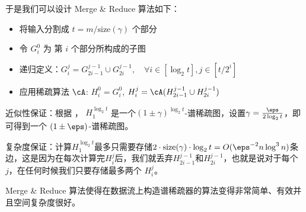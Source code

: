 \documentclass[lang=cn,newtx,10pt,scheme=chinese,chinesefont=nofont,citestyle=gb7714-2015, bibstyle=gb7714-2015]{elegantbook}
\begin{document}
\begin{refsection}
\begin{proposition}
\end{proposition}

于是我们可以设计 Merge \& Reduce 算法如下：
\begin{itemize}
    \item 将输入分割成 $t=m/\text{size}(\gamma)$ 个部分
    \item 令 $G_i^0$ 为 第 $i$ 个部分所构成的子图
    \item 递归定义：$G_i^j=G_{2i-1}^{j-1}\cup G_{2i}^{j-1},\quad \forall i\in[\log_2t],j\in [t/2^i]$
    \item 应用稀疏算法 $\cA$: $H_i^0=G_i^0$, $H_i^j=\cA(H_{2i-1}^{j-1}\cup H_{2i}^{j-1})$
\end{itemize}

近似性保证：根据 ， $H_1^{\log_2t}$ 是一个$(1\pm\gamma)^{\log_2t}$-谱稀疏图，设置$\gamma=\frac{\eps}{2\log_2t}$，即可得到一个 $(1\pm\eps)$-谱稀疏图。

复杂度保证：计算$H_1^{\log_2t}$最多只需要存储$2\cdot \text{size}(\gamma)\cdot \log_2t=O(\eps^{-2}n\log^3n)$条边，这是因为在每次计算完$H_i^j$后，我们就丢弃$H_{2i-1}^{j-1} $和$ H_{2i}^{j-1}$，也就是说对于每个 $j$，在任何时候我们只要存储最多两个 $H_i^j$。

Merge \& Reduce 算法使得在数据流上构造谱稀疏器的算法变得非常简单、有效并且空间复杂度很好。
\end{refsection}


% 

% 

% 

% 

\end{document}
